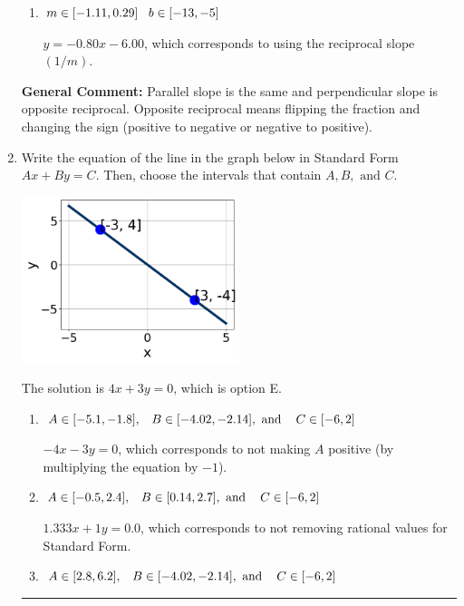 \documentclass{extbook}[14pt]
\newcommand{\litem}[1]{\item #1

\rule{\textwidth}{0.4pt}}
\begin{document}
\begin{enumerate}
{\begin{enumerate}[label=\Alph*.]
 $y = -1.25x + 6.00$, which corresponds to using the correct slope and getting the negative $y$-intercept.
\item \( m \in [-1.11, 0.29] \hspace*{3mm} b \in [-13, -5] \)

 $y = -0.80x - 6.00$, which corresponds to using the reciprocal slope $(1/m)$.
\end{enumerate}

\textbf{General Comment:} Parallel slope is the same and perpendicular slope is opposite reciprocal. Opposite reciprocal means flipping the fraction and changing the sign (positive to negative or negative to positive).
}
\litem{
Write the equation of the line in the graph below in Standard Form $Ax+By=C$. Then, choose the intervals that contain $A, B, \text{ and } C$.

\begin{center}
    \includegraphics[width=0.5\textwidth]{../Figures/linearGraphToStandardC.png}
\end{center}


The solution is \( 4x + 3y = 0 \), which is option E.\begin{enumerate}[label=\Alph*.]
\item \( A \in [-5.1, -1.8], \hspace{3mm} B \in [-4.02, -2.14], \text{ and } \hspace{3mm} C \in [-6, 2] \)

 $-4x - 3y = 0$, which corresponds to not making $A$ positive (by multiplying the equation by $-1$).
\item \( A \in [-0.5, 2.4], \hspace{3mm} B \in [0.14, 2.7], \text{ and } \hspace{3mm} C \in [-6, 2] \)

 $1.333x + 1y = 0.0$, which corresponds to not removing rational values for Standard Form.
\item \( A \in [2.8, 6.2], \hspace{3mm} B \in [-4.02, -2.14], \text{ and } \hspace{3mm} C \in [-6, 2] \)


\end{enumerate}}
\end{enumerate}
\end{document}
